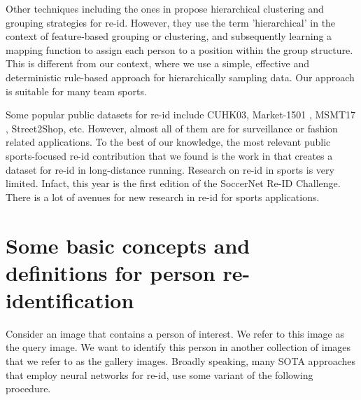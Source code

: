 \documentclass{article}
\begin{document}
Other techniques including the ones in \cite{groupreid1,groupreid2,groupreid3,groupreid4,groupreid5,groupreid6} propose hierarchical clustering and grouping strategies for re-id. However, they use the term 'hierarchical' in the context of feature-based grouping or clustering, and subsequently learning a mapping function to assign each person to a position within the group structure. This is different from our context, where we use a simple, effective and deterministic rule-based approach for hierarchically sampling data. Our approach is suitable for many team sports.

Some popular public datasets for re-id include CUHK03\cite{CUHK03}, Market-1501 \cite{Market-1501}, MSMT17 \cite{MSMT17}, Street2Shop\cite{Street2Shop}, etc. However, almost all of them are for surveillance or fashion related applications. To the best of our knowledge, the most relevant public sports-focused re-id contribution that we found is the work in \cite{penate2020tgc20reid} that creates a dataset for re-id in long-distance running. Research on re-id in sports is very limited. Infact, this year is the first edition of the SoccerNet \cite{soccerNetv3, soccerNetv2} Re-ID Challenge. There is a lot of avenues for new research in re-id for sports applications.

\section{Some basic concepts and definitions for person re-identification}
\label{sec:background}

Consider an image that contains a person of interest. We refer to this image as the query image. We want to identify this person in another collection of images that we refer to as the gallery images. Broadly speaking, many SOTA approaches \cite{wieczorek2021unreasonable, he2021transreid, zhou2021learning} that employ neural networks for re-id, use some variant of the following procedure. 
\end{document}

